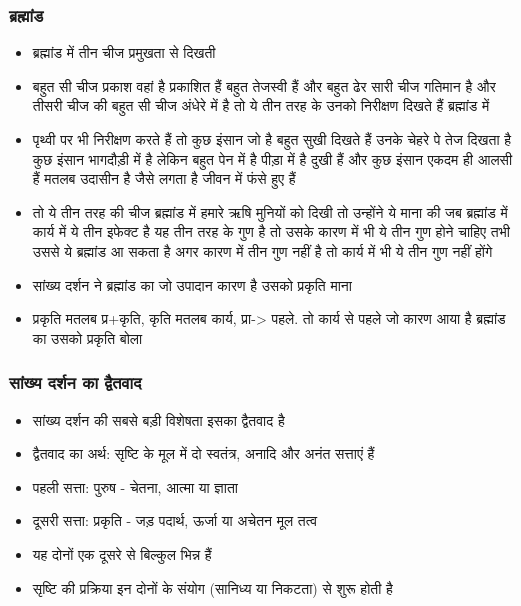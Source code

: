 \begin{frame}[fragile]\frametitle{ब्रह्मांड}

      \begin{itemize}
		\item  ब्रह्मांड में तीन चीज प्रमुखता से दिखती 
		\item बहुत सी चीज प्रकाश वहां है प्रकाशित हैं बहुत तेजस्वी हैं और बहुत ढेर सारी चीज गतिमान है और तीसरी चीज की बहुत सी चीज
अंधेरे में है तो ये तीन तरह के उनको निरीक्षण दिखते हैं ब्रह्मांड में 
		\item पृथ्वी पर भी निरीक्षण करते हैं तो कुछ इंसान जो है बहुत सुखी दिखते हैं उनके चेहरे पे तेज दिखता है कुछ इंसान भागदौड़ी में है लेकिन बहुत पेन में है पीड़ा में है दुखी हैं और कुछ इंसान एकदम ही आलसी हैं मतलब उदासीन है जैसे लगता है जीवन में फंसे हुए हैं 
		\item तो ये तीन तरह की चीज ब्रह्मांड में हमारे ऋषि मुनियों को दिखी तो उन्होंने ये माना की जब ब्रह्मांड में कार्य में ये तीन इफेक्ट है यह तीन तरह के गुण है तो उसके कारण में भी ये तीन गुण होने चाहिए तभी उससे ये ब्रह्मांड आ  सकता है अगर कारण में तीन गुण नहीं है तो कार्य
में भी ये तीन गुण नहीं होंगे 
		\item सांख्य दर्शन ने ब्रह्मांड का जो उपादान कारण है उसको प्रकृति माना
		\item प्रकृति मतलब प्र+कृति, कृति मतलब कार्य,  प्रा-> पहले. तो कार्य से पहले जो कारण आया है ब्रह्मांड का उसको प्रकृति
बोला
      \end{itemize}

\end{frame}

\begin{frame}[fragile]\frametitle{सांख्य दर्शन का द्वैतवाद}
      \begin{itemize}
	\item सांख्य दर्शन की सबसे बड़ी विशेषता इसका द्वैतवाद है
	\item द्वैतवाद का अर्थ: सृष्टि के मूल में दो स्वतंत्र, अनादि और अनंत सत्ताएं हैं
	\item पहली सत्ता: पुरुष - चेतना, आत्मा या ज्ञाता
	\item दूसरी सत्ता: प्रकृति - जड़ पदार्थ, ऊर्जा या अचेतन मूल तत्व
	\item यह दोनों एक दूसरे से बिल्कुल भिन्न हैं
	\item सृष्टि की प्रक्रिया इन दोनों के संयोग (सानिध्य या निकटता) से शुरू होती है
	  \end{itemize}
\end{frame}


